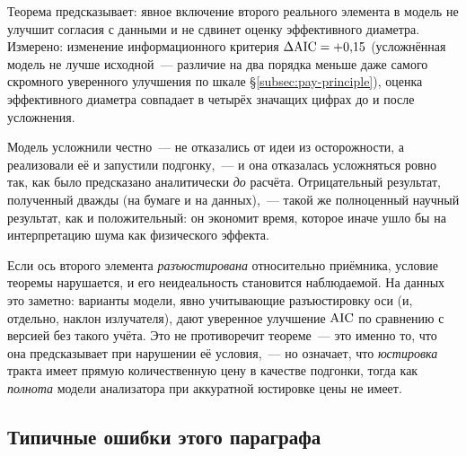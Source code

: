 \begin{strict}
Теорема предсказывает: явное включение второго реального элемента в модель не улучшит согласия
с данными и не сдвинет оценку эффективного диаметра. Измерено: изменение информационного критерия
$\Delta\mathrm{AIC}=+0{,}15$ (усложнённая модель не лучше исходной~--- различие на два порядка меньше даже
самого скромного уверенного улучшения по шкале §\ref{subsec:pay-principle}), оценка эффективного
диаметра совпадает в четырёх значащих цифрах до и после усложнения.
\end{strict}

\begin{intuition}
Модель усложнили честно~--- не отказались от идеи из осторожности, а реализовали её и запустили
подгонку,~--- и она отказалась усложняться ровно так, как было предсказано аналитически \emph{до}
расчёта. Отрицательный результат, полученный дважды (на бумаге и на данных),~--- такой же
полноценный научный результат, как и положительный: он экономит время, которое иначе ушло бы на
интерпретацию шума как физического эффекта.
\end{intuition}

\begin{warning}
Если ось второго элемента \emph{разъюстирована} относительно приёмника, условие теоремы
нарушается, и его неидеальность становится наблюдаемой. На данных это заметно: варианты модели,
явно учитывающие разъюстировку оси (и, отдельно, наклон излучателя), дают уверенное улучшение
$\operatorname{AIC}$ по сравнению с версией без такого учёта. Это не противоречит теореме~--- это именно то,
что она предсказывает при нарушении её условия,~--- но означает, что \emph{юстировка} тракта
имеет прямую количественную цену в качестве подгонки, тогда как \emph{полнота} модели анализатора
при аккуратной юстировке цены не имеет.
\end{warning}

\subsection{Типичные ошибки этого параграфа}

